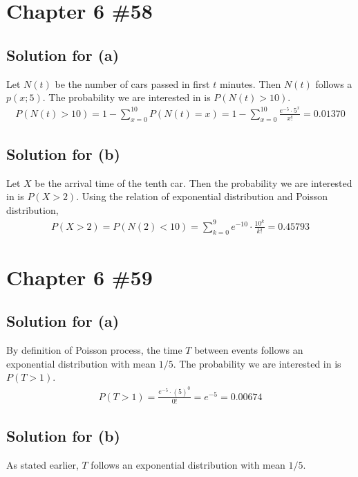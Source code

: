 \documentclass{scrartcl}
\begin{document}
\section{Chapter 6 \#58}
\subsection{Solution for (a)}
Let \(N(t)\) be the number of cars passed in first \(t\) minutes. Then \(N(t)\)
follows a \(p(x; 5)\). The probability we are interested in is \(P(N(t) >
10)\).
\begin{align*}
  P(N(t) > 10)
  = 1 - \sum^{10}_{x = 0} P(N(t) = x)
  = 1 - \sum^{10}_{x = 0} \frac{e^{-5} \cdot 5^x}{x!}
  = 0.01370
\end{align*}

\subsection{Solution for (b)}
Let \(X\) be the arrival time of the tenth car. Then the probability we are
interested in is \(P(X > 2)\). Using the relation of exponential distribution
and Poisson distribution,
\begin{align*}
  P(X > 2)
  = P(N(2) < 10)
  = \sum^9_{k = 0} e^{-10} \cdot \frac{10^k}{k!}
  = 0.45793
\end{align*}

\section{Chapter 6 \#59}
\subsection{Solution for (a)}
By definition of Poisson process, the time \(T\) between events follows an
exponential distribution with mean \(1 / 5\). The probability we are interested
in is \(P(T > 1)\).
\begin{align*}
  P(T > 1)
  = \frac{e^{-5} \cdot (5)^0}{0!}
  = e^{-5}
  = 0.00674
\end{align*}

\subsection{Solution for (b)}
As stated earlier, \(T\) follows an exponential distribution with mean \(1 /
5\).
\end{document}
